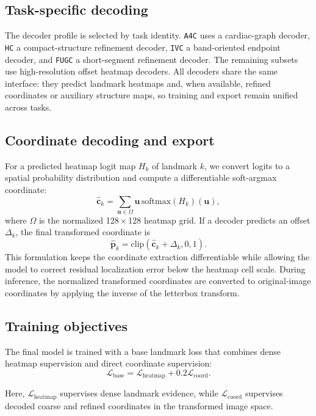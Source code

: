 \documentclass[runningheads]{llncs}
\begin{document}
\subsection{Task-specific decoding}
The decoder profile is selected by task identity. \texttt{A4C} uses a cardiac-graph decoder, \texttt{HC} a compact-structure refinement decoder, \texttt{IVC} a band-oriented endpoint decoder, and \texttt{FUGC} a short-segment refinement decoder. The remaining subsets use high-resolution offset heatmap decoders. All decoders share the same interface: they predict landmark heatmaps and, when available, refined coordinates or auxiliary structure maps, so training and export remain unified across tasks.

\subsection{Coordinate decoding and export}
For a predicted heatmap logit map $H_k$ of landmark $k$, we convert logits to a spatial probability distribution and compute a differentiable soft-argmax coordinate:
\begin{equation}
\hat{\mathbf{c}}_k =
\sum_{\mathbf{u}\in\Omega} \mathbf{u}\,
\mathrm{softmax}(H_k)(\mathbf{u}),
\end{equation}
where $\Omega$ is the normalized 128\,$\times$\,128 heatmap grid. If a decoder predicts an offset $\Delta_k$, the final transformed coordinate is
\begin{equation}
\hat{\mathbf{p}}_k =
\mathrm{clip}(\hat{\mathbf{c}}_k+\Delta_k,0,1).
\end{equation}
This formulation keeps the coordinate extraction differentiable while allowing the model to correct residual localization error below the heatmap cell scale. During inference, the normalized transformed coordinates are converted to original-image coordinates by applying the inverse of the letterbox transform.

\subsection{Training objectives}
The final model is trained with a base landmark loss that combines dense heatmap supervision and direct coordinate supervision:
\begin{equation}
\mathcal{L}_{\text{base}} =
\mathcal{L}_{\text{heatmap}} + 0.2 \mathcal{L}_{\text{coord}}.
\end{equation}

Here, $\mathcal{L}_{\text{heatmap}}$ supervises dense landmark evidence, while $\mathcal{L}_{\text{coord}}$ supervises decoded coarse and refined coordinates in the transformed image space.
\end{document}
